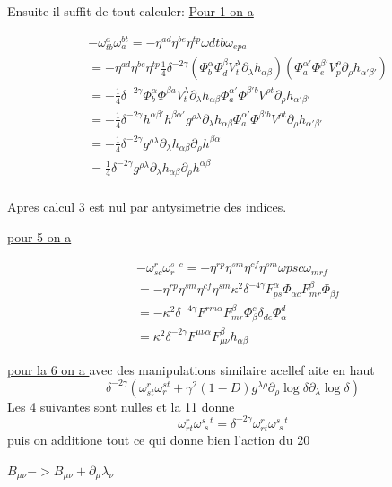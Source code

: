 \documentclass{article}
\begin{document}
Ensuite il suffit de tout calculer:
\underline{Pour 1 on a }

\begin{align*}
    &- \omega^{a}_{tb}\omega^{bt}_a = - \eta^{ad} \eta^{be}\eta^{tp} \omega{dtb} \omega_{epa} \\
    & =  - \eta^{ad} \eta^{be}\eta^{tp}\frac{1}{4} \delta^{-2\gamma}(\Phi^\alpha_b \Phi^\beta_d V^\lambda_t \partial_\lambda h_{\alpha \beta} )(\Phi^{\alpha '}_a \Phi^{\beta '}_e V^{\rho}_p \partial_\rho h_{\alpha ' \beta '})\\
    & = -\frac{1}{4} \delta^{-2\gamma} \Phi^\alpha_b \Phi^{\beta a}V^\lambda_t \partial_\lambda h_{\alpha \beta}\Phi^{\alpha'}_a \Phi^{\beta' b}V^{\rho t} \partial_\rho h_{\alpha ' \beta '} \\
    & = -\frac{1}{4} \delta^{-2\gamma}  h^{\alpha \beta'} h^{\beta \alpha'} g^{\rho \lambda} \partial_\lambda h_{\alpha \beta}\Phi^{\alpha'}_a \Phi^{\beta' b}V^{\rho t} \partial_\rho h_{\alpha ' \beta '}\\
    & =  -\frac{1}{4} \delta^{-2\gamma} g^{\rho \lambda} \partial_\lambda h_{\alpha \beta}\partial_\rho h^{\beta \alpha}\\
    & =  \frac{1}{4} \delta^{-2\gamma} g^{\rho \lambda} \partial_\lambda h_{\alpha \beta}\partial_\rho h^{\alpha \beta}\\
\end{align*}

Apres calcul 3 est nul par antysimetrie des indices.

\underline{pour 5 on a }


\begin{align*}
    & - \omega^{r}_{sc}\omega^{s \, \, \, c}_{r} = - \eta^{rp}\eta^{sm} \eta^{c f} \eta^{sm}\omega{psc} \omega_{mrf}\\
    & = - \eta^{rp}\eta^{sm} \eta^{c f} \eta^{sm} \kappa^2 \delta^{-4 \gamma} F^{\alpha}_{ps}\Phi_{\alpha c}F^{\beta}_{mr}\Phi_{\beta f}\\
    & = - \kappa^2 \delta^{-4 \gamma}F^{rm \alpha}F^{\beta}_{mr}\Phi_{\beta}^c \delta_{dc}\Phi^d_{\alpha }\\
    & = \kappa^2 \delta^{-2 \gamma}F^{\mu \nu \alpha}F^{\beta}_{\mu  \nu}h_{\alpha \beta}
\end{align*}

\underline{pour la 6 on a }
avec des manipulations similaire acellef aite en haut 
\begin{equation*}
    \delta^{-2 \gamma}(\omega^{r}_{st}\omega^{st}_r+ \gamma^{2}(1-D)g^{\lambda \rho}\partial_{\rho}\log{\delta}\partial_{\lambda}\log{\delta})
\end{equation*}
Les 4 suivantes sont nulles
et la 11 donne 
\begin{equation*}
    \omega^r_{rt} \omega^{s \, \, \, t}_{\, \, s} = \delta^{-2 \gamma} \omega^r_{rt} \omega^{s \, \, \, t}_{\, \, s} 
\end{equation*}
puis on additione tout ce qui donne bien  l'action du 20




$B_{\mu\nu} -> B_{\mu\nu} + \partial_{\mu}\lambda_{\nu}$
\end{document}
